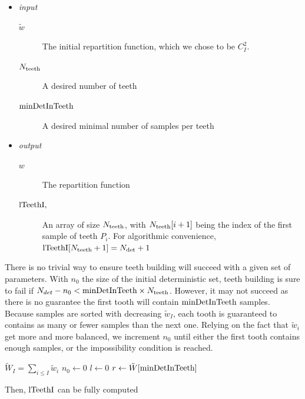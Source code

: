 \documentclass[./thesis.tex]{subfiles}
\begin{document}
\begin{itemize}

\item
\emph{input}
\begin{description}
\item[$\tilde w$]
The initial repartition function, which we chose to be $C_I^2$.
\item[$N_\text{teeth}$]
A desired number of teeth
\item[$\text{minDetInTeeth}$]
A desired minimal number of samples per teeth
\end{description}

\item
\emph{output}
\begin{description}
\item[$w$]
The repartition function
\item[$\text{lTeethI}, $]
An array of size $N_\text{teeth}$, with $N_\text{teeth}[i+1]$ being the index of the first sample of teeth $P_i$. For algorithmic convenience, $\text{lTeethI}[N_\text{teeth}+1] = {N_\text{det}}+1$  
\end{description}
\end{itemize}


There is no trivial way to ensure teeth building will succeed with a given set of parameters. 
With $n_0$ the size of the initial deterministic set, teeth building is sure to fail if $N_{det} - n_0 < \text{minDetInTeeth} \times N_\text{teeth}$. However, it may not succeed as there is no guarantee the first tooth will contain $\text{minDetInTeeth}$ samples. Because samples are sorted with decreasing $\tilde w_I$, each tooth is guaranteed to contains as many or fewer samples than the next one.
Relying on the fact that $\tilde w_i$ get more and more balanced, we increment $n_0$ until either the first tooth contains enough samples, or the impossibility condition is reached.

\begin{algorithm}
	$\tilde W_I = \sum_{i \leq I} {\tilde w_i}$ \;
	$n_0 \gets 0$ \;
	$l \gets 0$ \;
	$r \gets \tilde W[\text{minDetInTeeth}]$ \;	
\end{algorithm}

Then, $\text{lTeethI}$ can be fully computed
\end{document}
